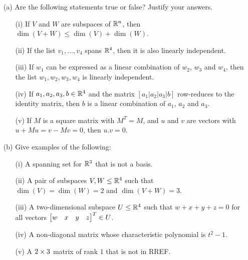 \documentclass[a4paper]{article}
\begin{document}
\begin{problem}[2012-13]
 \begin{itemize}
  \item[(a)] Are the following statements true or false?  Justify your
   answers. 
   \begin{itemize}
    \item[(i)] If $V$ and $W$ are subspaces of ${\mathbb{R}}^n$, then
     $\dim(V+W)\leq\dim(V)+\dim(W)$.
    \item[(ii)] If the list $v_1,\dotsc,v_4$ spans ${\mathbb{R}}^4$, then it is
     also linearly independent.
    \item[(iii)] If $w_1$ can be expressed as a linear combination of
     $w_2$, $w_3$ and $w_4$, then the list $w_1,w_2,w_3,w_4$ is
     linearly independent.
    \item[(iv)] If $a_1,a_2,a_3,b\in{\mathbb{R}}^4$ and the matrix
     $[a_1|a_2|a_3|b]$ row-reduces to the identity matrix, then $b$ is
     a linear combination of $a_1$, $a_2$ and $a_3$.
    \item[(v)] If $M$ is a square matrix with $M^T=M$, and $u$ and $v$
     are vectors with $u+Mu=v-Mv=0$, then $u.v=0$.
   \end{itemize}
  \item[(b)] Give examples of the following: 
   \begin{itemize}
    \item[(i)] A spanning set for ${\mathbb{R}}^3$ that is not a basis.
    \item[(ii)] A pair of subspaces $V,W\leq{\mathbb{R}}^4$ such that
     $\dim(V)=\dim(W)=2$ and $\dim(V+W)=3$.
    \item[(iii)] A two-dimensional subspace $U\leq{\mathbb{R}}^4$ such that
     $w+x+y+z=0$ for all vectors $\left[\begin{matrix} w&x&y&z\end{matrix}\right]^T\in U$.
    \item[(iv)] A non-diagonal matrix whose characteristic polynomial
     is $t^2-1$.
    \item[(v)] A $2\times 3$ matrix of rank $1$ that is not in RREF.
   \end{itemize}
 \end{itemize}
\end{problem}
\end{document}
